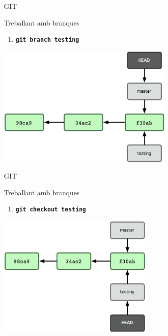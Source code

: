 \documentclass[10pt,xcolor={rgb}]{beamer}
\begin{document}
    \begin{frame}[fragile]{GIT}
      \begin{block}{Treballant amb branques}

        \begin{enumerate}
          \item \texttt{\textbf{git branch testing}}
        \end{enumerate}

        \centering
        \includegraphics[height=6cm]{b1.png}

      \end{block}
    \end{frame}

    \begin{frame}[fragile]{GIT}
      \begin{block}{Treballant amb branques}

        \begin{enumerate}
          \item \texttt{\textbf{git checkout testing}}
        \end{enumerate}

        \centering
        \includegraphics[height=6cm]{b2.png}

      \end{block}
    \end{frame}
\end{document}
